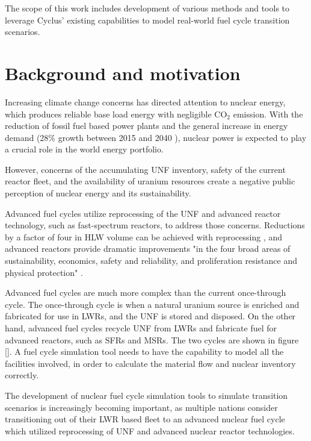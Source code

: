 The scope of this work includes development of
various methods and tools to leverage Cyclus' existing
capabilities to model real-world fuel cycle transition scenarios.

\section{Background and motivation}
Increasing climate change concerns has directed attention
to nuclear energy, which produces reliable base load energy
with negligible CO$_2$ emission. With the reduction of fossil
fuel based power plants and the general increase in energy demand
(28\% growth between 2015 and 2040 \cite{conti_international_2016}),
nuclear power is expected to play a crucial role in the world energy portfolio.

However, concerns of the accumulating \gls{UNF} inventory,
safety of the current reactor fleet, and the availability of
uranium resources create a negative public perception of
nuclear energy and its sustainability.

Advanced fuel cycles utilize reprocessing of the \gls{UNF}
and advanced reactor technology, such as fast-spectrum reactors,
to address those concerns. Reductions by a factor of four
in \gls{HLW} volume can be achieved with reprocessing \cite{widder_benefits_2010},
and advanced reactors provide dramatic improvements "in the four
broad areas of sustainability, economics, safety and reliability,
and proliferation resistance and physical protection" \cite{committee_technology_2002}.

Advanced fuel cycles are much more complex than
the current once-through cycle. The once-through cycle is when a natural uranium source is
enriched and fabricated for use in \glspl{LWR}, and the \gls{UNF} is stored and disposed.
On the other hand, advanced fuel cycles recycle \gls{UNF} from \glspl{LWR} and
fabricate fuel for advanced reactors, such as \glspl{SFR} and \glspl{MSR}. 
The two cycles are shown in figure []. A fuel cycle simulation tool needs
to have the capability to model all the facilities involved, in order to
calculate the material flow and nuclear inventory correctly.

The development of nuclear fuel cycle simulation tools
to simulate transition scenarios
is increasingly becoming important, as multiple nations
consider transitioning out of their \gls{LWR} based fleet
to an advanced nuclear fuel cycle which utilized reprocessing
of \gls{UNF} and advanced nuclear reactor technologies.

